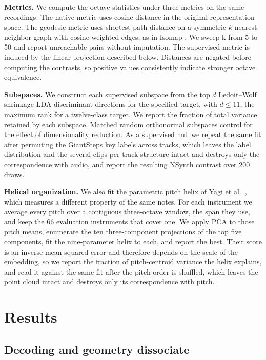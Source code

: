 \documentclass{article}
\begin{document}
\noindent\textbf{Metrics.} We compute the octave statistics under three metrics on the same recordings. The native metric uses cosine distance in the original representation space. The geodesic metric uses shortest-path distance on a
symmetric $k$-nearest-neighbor graph with cosine-weighted edges, as in Isomap
\cite{isomap}. We sweep k from 5 to 50 and report unreachable pairs without imputation. The supervised metric is induced by the linear projection described below. Distances are negated before computing the contrasts, so positive values consistently indicate stronger octave equivalence.

\noindent\textbf{Subspaces.} We construct each supervised subspace from the top $d$
Ledoit--Wolf shrinkage-LDA \cite{ledoit2004} discriminant directions for the specified target, with $d\leq11$, the maximum rank for a twelve-class target. We report the fraction of total variance retained by each subspace. Matched random orthonormal subspaces control for the effect of dimensionality reduction. As a supervised null we repeat the same fit after permuting the GiantSteps key labels across tracks, which leaves the label distribution and the several-clips-per-track structure intact and destroys only the correspondence with audio, and report the resulting NSynth contrast over 200 draws.

\noindent\textbf{Helical organization.} We also fit the parametric pitch helix
of Yagi et al.~\cite{yagi2026}, which measures a different property of the same
notes. For each instrument we average every pitch over a contiguous
three-octave window, the span they use, and keep the 66 evaluation instruments
that cover one. We apply PCA to those pitch means, enumerate the ten
three-component projections of the top five components, fit the nine-parameter
helix to each, and report the best. Their score is an inverse mean squared
error and therefore depends on the scale of the embedding, so we report the
fraction of pitch-centroid variance the helix explains, and read it against the
same fit after the pitch order is shuffled, which leaves the point cloud intact
and destroys only its correspondence with pitch.





\section{Results}
\label{sec:results}

\subsection{Decoding and geometry dissociate}
\end{document}
